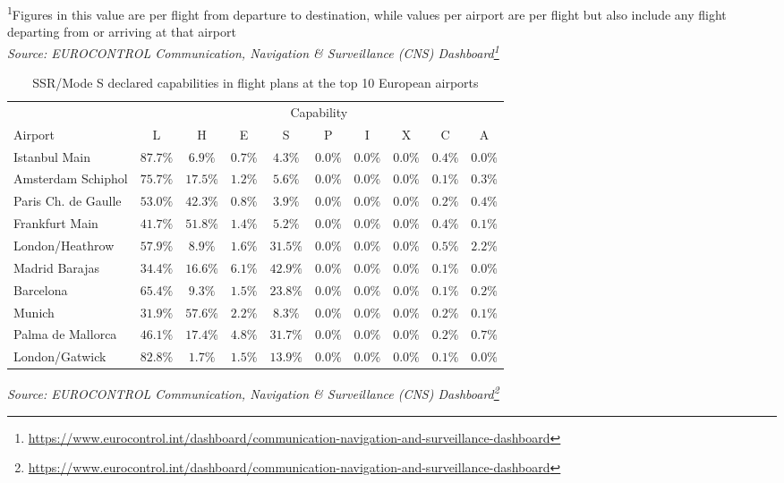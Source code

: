 \documentclass[
  11pt,
  a4paper,
]{book}
\DeclareRobustCommand{\href}[2]{#2\footnote{\url{#1}}}
\begin{document}
\begin{minipage}{\linewidth}
\textsuperscript{1}Figures in this value are per flight from departure to destination, while values per airport are per flight but also include any flight departing from or arriving at that airport\\
\emph{Source: \href{https://www.eurocontrol.int/dashboard/communication-navigation-and-surveillance-dashboard}{EUROCONTROL Communication, Navigation \& Surveillance (CNS) Dashboard}}\\
\end{minipage}

\hypertarget{tbl-ssr-top10}{}
\setlength{\LTpost}{0mm}
\begin{longtable}{lccccccccc}
\caption{\label{tbl-ssr-top10}SSR/Mode S declared capabilities in flight plans at the top 10 European
airports }\tabularnewline

\toprule
 & \multicolumn{9}{c}{Capability} \\ 
\cmidrule(lr){2-10}
Airport & L & H & E & S & P & I & X & C & A \\ 
\midrule
Istanbul Main & $87.7\%$ & $6.9\%$ & $0.7\%$ & $4.3\%$ & $0.0\%$ & $0.0\%$ & $0.0\%$ & $0.4\%$ & $0.0\%$ \\ 
Amsterdam Schiphol & $75.7\%$ & $17.5\%$ & $1.2\%$ & $5.6\%$ & $0.0\%$ & $0.0\%$ & $0.0\%$ & $0.1\%$ & $0.3\%$ \\ 
Paris Ch. de Gaulle & $53.0\%$ & $42.3\%$ & $0.8\%$ & $3.9\%$ & $0.0\%$ & $0.0\%$ & $0.0\%$ & $0.2\%$ & $0.4\%$ \\ 
Frankfurt Main & $41.7\%$ & $51.8\%$ & $1.4\%$ & $5.2\%$ & $0.0\%$ & $0.0\%$ & $0.0\%$ & $0.4\%$ & $0.1\%$ \\ 
London/Heathrow & $57.9\%$ & $8.9\%$ & $1.6\%$ & $31.5\%$ & $0.0\%$ & $0.0\%$ & $0.0\%$ & $0.5\%$ & $2.2\%$ \\ 
Madrid Barajas & $34.4\%$ & $16.6\%$ & $6.1\%$ & $42.9\%$ & $0.0\%$ & $0.0\%$ & $0.0\%$ & $0.1\%$ & $0.0\%$ \\ 
Barcelona & $65.4\%$ & $9.3\%$ & $1.5\%$ & $23.8\%$ & $0.0\%$ & $0.0\%$ & $0.0\%$ & $0.1\%$ & $0.2\%$ \\ 
Munich & $31.9\%$ & $57.6\%$ & $2.2\%$ & $8.3\%$ & $0.0\%$ & $0.0\%$ & $0.0\%$ & $0.2\%$ & $0.1\%$ \\ 
Palma de Mallorca & $46.1\%$ & $17.4\%$ & $4.8\%$ & $31.7\%$ & $0.0\%$ & $0.0\%$ & $0.0\%$ & $0.2\%$ & $0.7\%$ \\ 
London/Gatwick & $82.8\%$ & $1.7\%$ & $1.5\%$ & $13.9\%$ & $0.0\%$ & $0.0\%$ & $0.0\%$ & $0.1\%$ & $0.0\%$ \\ 
\bottomrule
\end{longtable}
\begin{minipage}{\linewidth}
\emph{Source: \href{https://www.eurocontrol.int/dashboard/communication-navigation-and-surveillance-dashboard}{EUROCONTROL Communication, Navigation \& Surveillance (CNS) Dashboard}}\\
\end{minipage}
\end{document}
